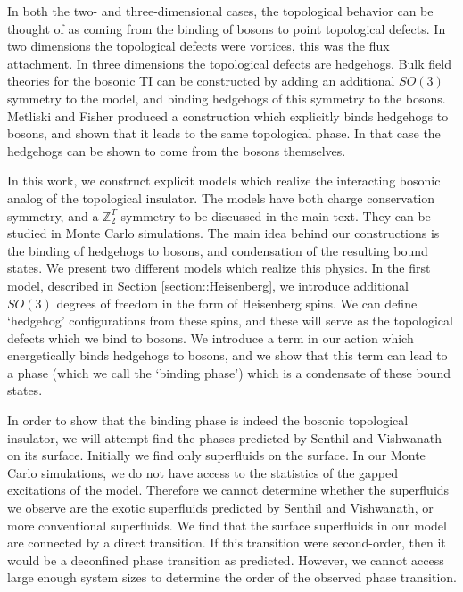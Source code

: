 \documentclass[prb,twocolumn]{revtex4-1}
\def\ztwot{\mathbb{Z}_2^T}
\begin{document}
In both the two- and three-dimensional cases, the topological behavior can be thought of as coming from the binding of bosons to point topological defects. In two dimensions the topological defects were vortices, this was the flux attachment. In three dimensions the topological defects are hedgehogs.
Bulk field theories for the bosonic TI can be constructed by adding an additional $SO(3)$ symmetry to the model, and binding hedgehogs of this symmetry to the bosons.\cite{SenthilVishwanath} Metliski and Fisher produced a construction which explicitly binds hedgehogs to bosons, and shown that it leads to the same topological phase. In that case the hedgehogs can be shown to come from the bosons themselves.\cite{Max} 

In this work, we construct explicit models which realize the interacting bosonic analog of the topological insulator. The models have both charge conservation symmetry, and a $\ztwot$ symmetry to be discussed in the main text. They can be studied in Monte Carlo simulations. The main idea behind our constructions is the binding of hedgehogs to bosons, and condensation of the resulting bound states. We present two different models which realize this physics. In the first model, described in Section \ref{section::Heisenberg}, we introduce additional $SO(3)$ degrees of freedom in the form of Heisenberg spins. We can define `hedgehog' configurations from these spins, and these will serve as the topological defects which we bind to bosons. We introduce a term in our action which energetically binds hedgehogs to bosons, and we show that this term can lead to a phase (which we call the `binding phase') which is a condensate of these bound states.

In order to show that the binding phase is indeed the bosonic topological insulator, we will attempt find the phases predicted by Senthil and Vishwanath on its surface. Initially we find only superfluids on the surface. In our Monte Carlo simulations, we do not have access to the statistics of the gapped excitations of the model. Therefore we cannot determine whether the superfluids we observe are the exotic superfluids predicted by Senthil and Vishwanath, or more conventional superfluids. We find that the surface superfluids in our model are connected by a direct transition. If this transition were second-order, then it would be a deconfined phase transition as predicted. However, we cannot access large enough system sizes to determine the order of the observed phase transition. 
\end{document}
